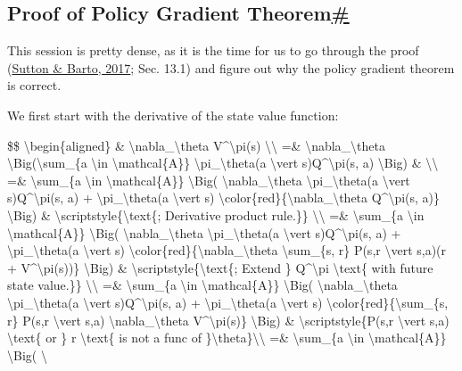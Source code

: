 \subsection{\texorpdfstring{Proof of Policy Gradient Theorem\hyperref[proof-of-policy-gradient-theorem]{\#}}{Proof of Policy Gradient Theorem\#}}\label{proof-of-policy-gradient-theorem}

This session is pretty dense, as it is the time for us to go through the proof (\href{http://incompleteideas.net/book/bookdraft2017nov5.pdf}{Sutton \& Barto, 2017}; Sec. 13.1) and figure out why the policy gradient theorem is correct.

We first start with the derivative of the state value function:

\$\$ \textbackslash begin\{aligned\} \& \textbackslash nabla\_\textbackslash theta V\^{}\textbackslash pi(s) \textbackslash\textbackslash{} =\& \textbackslash nabla\_\textbackslash theta \textbackslash Big(\textbackslash sum\_\{a \textbackslash in \textbackslash mathcal\{A\}\} \textbackslash pi\_\textbackslash theta(a \textbackslash vert s)Q\^{}\textbackslash pi(s, a) \textbackslash Big) \& \textbackslash\textbackslash{} =\& \textbackslash sum\_\{a \textbackslash in \textbackslash mathcal\{A\}\} \textbackslash Big( \textbackslash nabla\_\textbackslash theta \textbackslash pi\_\textbackslash theta(a \textbackslash vert s)Q\^{}\textbackslash pi(s, a) + \textbackslash pi\_\textbackslash theta(a \textbackslash vert s) \textbackslash color\{red\}\{\textbackslash nabla\_\textbackslash theta Q\^{}\textbackslash pi(s, a)\} \textbackslash Big) \& \textbackslash scriptstyle\{\textbackslash text\{; Derivative product rule.\}\} \textbackslash\textbackslash{} =\& \textbackslash sum\_\{a \textbackslash in \textbackslash mathcal\{A\}\} \textbackslash Big( \textbackslash nabla\_\textbackslash theta \textbackslash pi\_\textbackslash theta(a \textbackslash vert s)Q\^{}\textbackslash pi(s, a) + \textbackslash pi\_\textbackslash theta(a \textbackslash vert s) \textbackslash color\{red\}\{\textbackslash nabla\_\textbackslash theta \textbackslash sum\_\{s\textquotesingle, r\} P(s\textquotesingle,r \textbackslash vert s,a)(r + V\^{}\textbackslash pi(s\textquotesingle))\} \textbackslash Big) \& \textbackslash scriptstyle\{\textbackslash text\{; Extend \} Q\^{}\textbackslash pi \textbackslash text\{ with future state value.\}\} \textbackslash\textbackslash{} =\& \textbackslash sum\_\{a \textbackslash in \textbackslash mathcal\{A\}\} \textbackslash Big( \textbackslash nabla\_\textbackslash theta \textbackslash pi\_\textbackslash theta(a \textbackslash vert s)Q\^{}\textbackslash pi(s, a) + \textbackslash pi\_\textbackslash theta(a \textbackslash vert s) \textbackslash color\{red\}\{\textbackslash sum\_\{s\textquotesingle, r\} P(s\textquotesingle,r \textbackslash vert s,a) \textbackslash nabla\_\textbackslash theta V\^{}\textbackslash pi(s\textquotesingle)\} \textbackslash Big) \& \textbackslash scriptstyle\{P(s\textquotesingle,r \textbackslash vert s,a) \textbackslash text\{ or \} r \textbackslash text\{ is not a func of \}\textbackslash theta\}\textbackslash\textbackslash{} =\& \textbackslash sum\_\{a \textbackslash in \textbackslash mathcal\{A\}\} \textbackslash Big( \textbackslash 